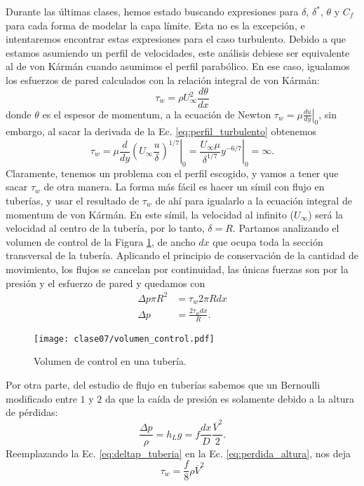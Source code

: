 Durante las últimas clases, hemos estado buscando expresiones para $\delta$, $\delta^*$, $\theta$ y $C_f$ para cada forma de modelar la capa límite. 
Esta no es la excepción, e intentaremos encontrar estas expresiones para el caso turbulento.
Debido a que estamos asumiendo un perfil de velocidades, este análisis debiese ser equivalente al de von Kármán cuando asumimos el perfil parabólico.
En ese caso, igualamos los esfuerzos de pared calculados con la relación integral de von Kármán:
%
\begin{equation}\label{eq:integral_vK}
\tau_w = \rho U_\infty^2 \frac{d\theta}{dx}
\end{equation}
%
donde $\theta$ es el espesor de momentum, a la ecuación de Newton $\tau_w = \left.\mu\frac{du}{dy}\right|_0$, sin embargo, al sacar la derivada de la Ec. \eqref{eq:perfil_turbulento} obtenemos
%
\begin{equation}
\tau_w = \left.\mu \frac{d}{dy}\left(U_\infty\frac{u}{\delta}\right)^{1/7}\right|_0 = \left.\frac{U_\infty\mu}{\delta^{1/7}}y^{-6/7}\right|_0 = \infty.
\end{equation}
%
Claramente, tenemos un problema con el perfil escogido, y vamos a tener que sacar $\tau_w$ de otra manera.
La forma más fácil es hacer un símil con flujo en tuberías, y usar el resultado de $\tau_w$ de ahí para igualarlo a la ecuación integral de momentum de von Kármán.
En este símil, la velocidad al infinito ($U_\infty$) será la velocidad al centro de la tubería, por lo tanto, $\delta=R$.
Partamos analizando el volumen de control de la Figura \ref{fig:volumen_control}, de ancho $dx$ que ocupa toda la sección transversal de la tubería.
Aplicando el principio de conservación de la cantidad de movimiento, los flujos se cancelan por continuidad, las únicas fuerzas son por la presión y el esfuerzo de pared y quedamos con
%
\begin{align}\label{eq:deltap_tuberia}
\Delta p\pi R^2 &= \tau_w2\pi Rdx\nonumber\\
\Delta p &= \frac{2\tau_w dx}{R}.
\end{align}
%
\begin{figure}
\centering
\texttt{[image: clase07/volumen\_control.pdf]}
\caption{Volumen de control en una tubería.}
\label{fig:volumen_control}
\end{figure}

Por otra parte, del estudio de flujo en tuberías sabemos que un Bernoulli modificado entre $1$ y $2$ da que la caída de presión es solamente debido a la altura de pérdidas:
%
\begin{equation}\label{eq:perdida_altura}
\frac{\Delta p}{\rho} = h_L g = f \frac{dx}{D}\frac{\overline{V}^2}{2}.
\end{equation}
%
Reemplazando la Ec. \eqref{eq:deltap_tuberia} en la Ec. \eqref{eq:perdida_altura}, nos deja
%
\begin{equation}
\tau_w = \frac{f}{8}\rho\overline{V}^2
\end{equation}


